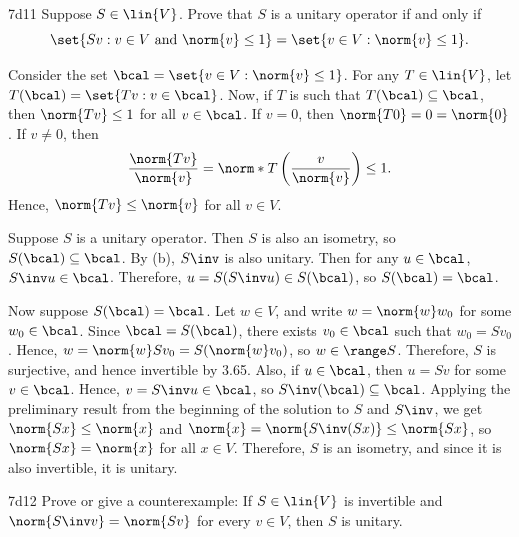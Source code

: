 \begin{exercise}{7d11}
    Suppose $S \in \lin{V}$.
    Prove that $S$ is a unitary operator if and only if
    \[
        \set{Sv : v \in V \text{ and } \norm{v} \leq 1} = \set{v \in V : \norm{v} \leq 1}.
    \]
\end{exercise}

\begin{sol}
    Consider the set $\bcal = \set{v \in V : \norm{v} \leq 1}$.
    For any $T \in \lin{V}$, let $T(\bcal) = \set{Tv : v \in \bcal}$.
    Now, if $T$ is such that $T(\bcal) \subseteq \bcal$, then $\norm{T v} \leq 1$ for all $v \in \bcal$.
    If $v = 0$, then $\norm{T0} = 0 = \norm{0}$.
    If $v \neq 0$, then
    \[
        \frac{\norm{T v}}{\norm{v}} = \norm*{T\left(\frac{v}{\norm{v}}\right)} \leq 1.
    \]
    Hence, $\norm{Tv} \leq \norm{v}$ for all $v \in V$.

    \rightimp Suppose $S$ is a unitary operator.
    Then $S$ is also an isometry, so $S(\bcal) \subseteq \bcal$.
    By (b), $S\inv$ is also unitary.
    Then for any $u \in \bcal$, $S\inv u \in \bcal$.
    Therefore, $u = S(S\inv u) \in S(\bcal)$, so $S(\bcal) = \bcal$.

    \leftimp Now suppose $S(\bcal) = \bcal$.
    Let $w \in V$, and write $w = \norm{w} w_0$ for some $w_0 \in \bcal$.
    Since $\bcal = S(\bcal)$, there exists $v_0 \in \bcal$ such that $w_0 = S v_0$.
    Hence, $w = \norm{w} S v_0 = S(\norm{w} v_0)$, so $w \in \range S$.
    Therefore, $S$ is surjective, and hence invertible by 3.65.
    Also, if $u \in \bcal$, then $u = S v$ for some $v \in \bcal$.
    Hence, $v = S\inv u \in \bcal$, so $S\inv(\bcal) \subseteq \bcal$.
    Applying the preliminary result from the beginning of the solution to $S$ and $S\inv$, we get $\norm{Sx} \leq \norm{x}$ and $\norm{x} = \norm{S\inv (Sx)} \leq \norm{Sx}$, so $\norm{Sx} = \norm{x}$ for all $x \in V$.
    Therefore, $S$ is an isometry, and since it is also invertible, it is unitary.
\end{sol}

\begin{exercise}{7d12}
    Prove or give a counterexample: If $S \in \lin{V}$ is invertible and $\norm{S\inv v} = \norm{Sv}$ for every $v \in V$, then $S$ is unitary.

\end{exercise}

